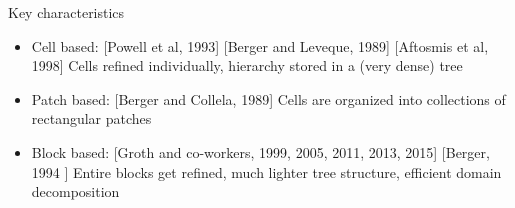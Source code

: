 \documentclass{beamer}
\begin{document}
\begin{frame}
\begin{minipage}[t][1\textheight]{1\textwidth}
\begin{exampleblock}{Key characteristics}
\begin{figure}
\end{figure}

\vspace{5pt}
\begin{itemize}
\tiny
\item Cell based: [Powell et al, 1993] [Berger and Leveque, 1989] [Aftosmis et al, 1998] \newline Cells refined individually, hierarchy stored in a (very dense) tree

\item Patch based: [Berger and Collela, 1989] \newline Cells are organized into collections of rectangular patches

\item Block based:  [Groth and co-workers, 1999, 2005, 2011, 2013, 2015] [Berger, 1994 ] \newline Entire blocks get refined, much lighter tree structure, efficient domain decomposition
\end{itemize}
\end{exampleblock}
\end{minipage}

\end{frame}
\end{document}
